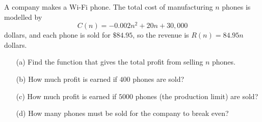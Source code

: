 A company makes a Wi-Fi phone. The total cost of manufacturing $n$ phones is modelled by
\[C(n)=-0.002n^2+20n+30{,}000\]
dollars, and each phone is sold for $\$84.95$, so the revenue is $R(n)=84.95n$ dollars.
\begin{enumerate}
\item[(a)] Find the function that gives the total profit from selling $n$ phones.
\item[(b)] How much profit is earned if $400$ phones are sold?
\item[(c)] How much profit is earned if $5000$ phones (the production limit) are sold?
\item[(d)] How many phones must be sold for the company to break even?
\end{enumerate}

